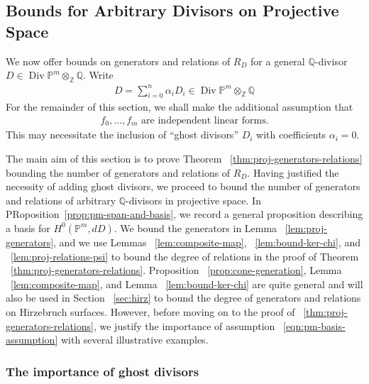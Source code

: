 \documentclass{amsart}
\theoremstyle{plain}
\theoremstyle{definition}
\theoremstyle{remark}
\numberwithin{equation}{section}
\newcommand\ssec{\subsection}
\newcommand\sssec{\subsubsection}
\newcommand\bq{{\mathbb Q}}
\newcommand\bp{{\mathbb P}}
\newcommand\bz{{\mathbb Z}}
\DeclareMathOperator\di{Div}
\begin{document}
\ssec{Bounds for Arbitrary Divisors on Projective Space}
\label{ssec:arbitrary-projective}
We now offer bounds on generators and relations of $R_D$ for a general $\bq$-divisor $D \in \di \bp^m \otimes_\bz \bq$.
Write \begin{align*}
	D = \sum_{i=0}^{n}\alpha_i D_i \in \di \bp^m \otimes_\bz \bq
\end{align*}
For the remainder of this section, we shall make the additional assumption that 
\begin{align} \label{eqn:pm-basis-assumption} f_0, \ldots, f_{m}
	\text{ are independent linear forms.} \end{align}
This may necessitate the inclusion of ``ghost divisors'' $D_i$ with coefficients $\alpha_i = 0$. 

The main aim of this section is to prove Theorem
~\ref{thm:proj-generators-relations} bounding the number of generators and
relations of $R_D$. 
Having justified the necessity of adding ghost divisors, we proceed to bound the
number of generators and relations of arbitrary $\bq$-divisors in 
projective space. 
In PRoposition~\ref{prop:pm-span-and-basis}, we record a general proposition describing
a basis for $H^0(\bp^m, dD)$.
We bound the generators in Lemma ~\ref{lem:proj-generators}, and we use Lemmas ~\ref{lem:composite-map}, ~\ref{lem:bound-ker-chi}, and ~\ref{lem:proj-relations-psi} to bound the 
degree of relations in the proof of Theorem ~\ref{thm:proj-generators-relations}. Proposition ~\ref{prop:cone-generation}, Lemma ~\ref{lem:composite-map}, and Lemma ~\ref{lem:bound-ker-chi} are quite 
general and will also be used in Section ~\ref{sec:hirz} to bound the 
degree of generators and relations on Hirzebruch surfaces.
However, before moving on to the proof of ~\ref{thm:proj-generators-relations}, we justify the importance of assumption
~\eqref{eqn:pm-basis-assumption} with several illustrative examples.
\sssec*{The importance of ghost divisors}
\label{sssec:ghost-divisors}
\end{document}
